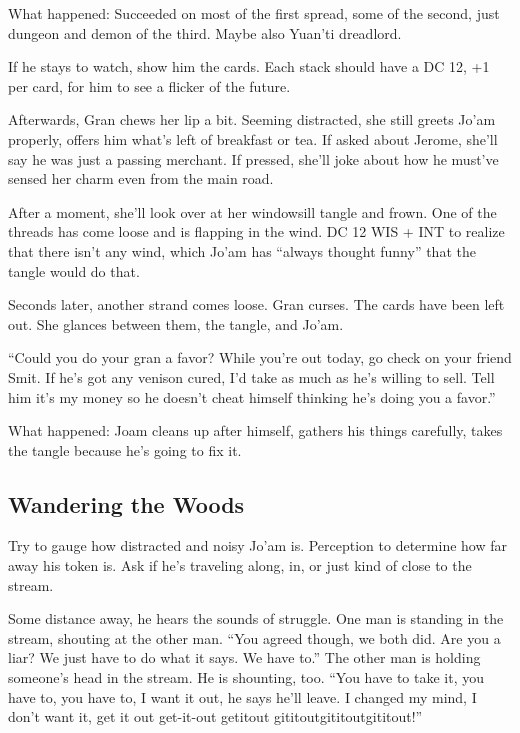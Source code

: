 \begin{multicols}{2}
\begin{aloud}
  What happened: Succeeded on most of the first spread, some of the second,
    just dungeon and demon of the third.  Maybe also Yuan'ti dreadlord.
  \end{aloud}

If he stays to watch, show him the cards.
Each stack should have a DC 12, +1 per card, for him to see a flicker of the future.

Afterwards, Gran chews her lip a bit.
Seeming distracted, she still greets Jo'am  properly, offers him what's left of breakfast or tea.
If asked about Jerome, she'll say he was just a passing merchant.
If pressed, she'll joke about how he must've sensed her charm even from the main road.

After a moment, she'll look over at her windowsill tangle and frown.
One of the threads has come loose and is flapping in the wind.
DC 12 WIS + INT to realize that there isn't any wind, which Jo'am has ``always thought funny''
that the tangle would do that.

Seconds later, another strand comes loose.
Gran curses.
The cards have been left out.
She glances between them, the tangle, and Jo'am.

``Could you do your gran a favor?
While you're out today, go check on your friend Smit.
If he's got any venison cured, I'd take as much as he's willing to sell.
Tell him it's my money so he doesn't cheat himself thinking he's doing you a favor.''

  \begin{aloud}
What happened: Joam cleans up after himself, gathers his things carefully, takes the tangle
  because he's going to fix it.
\end{aloud}

\subsection{Wandering the Woods}

Try to gauge how distracted and noisy Jo'am is.
Perception to determine how far away his token is.
Ask if he's traveling along, in, or just kind of close to the stream.

Some distance away, he hears the sounds of struggle.
One man is standing in the stream, shouting at the other man.
``You agreed though, we both did.
  Are you a liar?
  We just have to do what it says.
  We have to.''
The other man is holding someone's head in the stream.
He is shounting, too.
``You have to take it, you have to, you have to, I want it out, he says he'll leave.
I changed my mind, I don't want it, get it out get-it-out getitout gititoutgititoutgititout!''


\end{multicols}
